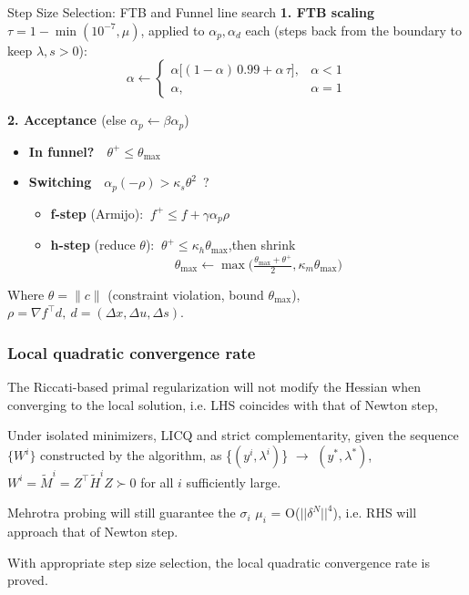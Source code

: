 \documentclass[10pt,aspectratio=1610]{beamer} %
\begin{document}
\begin{frame}{Step Size Selection: FTB and Funnel line search}
\textbf{\textcolor{blue!60!black}{1. FTB scaling}}\quad
$\tau=1-\min(10^{-7},\mu)$, applied to $\alpha_p,\alpha_d$ each (steps back from the boundary to keep $\lambda,s>0$):
\[
\alpha \leftarrow
\begin{cases}
\alpha\big[(1-\alpha)\,0.99+\alpha\,\tau\big], & \alpha<1\\
\alpha, & \alpha=1
\end{cases}
\]
 
\vspace{0.4em}
\textbf{\textcolor{blue!60!black}{2. Acceptance \cite{kiesslingUnifiedFunnelRestoration2025}}}\quad (else $\alpha_p\!\leftarrow\!\beta\alpha_p$)
\begin{itemize}
  \item \textbf{In funnel?}\ \ $\theta^+\le\theta_{\max}$
  \item \textbf{Switching}\ \ $\alpha_p(-\rho)>\kappa_{s}\theta^2$\ ?
  \begin{itemize}
    \item[$\rightarrow$] \textbf{f-step} (Armijo): $\ f^+\le f+\gamma\alpha_p\rho$
    \item[$\rightarrow$] \textbf{h-step} (reduce $\theta$): $\ \theta^+\le \kappa_{h}\theta_{\max}$,\quad then shrink
    \[
      \theta_{\max}\leftarrow\max\big(\tfrac{\theta_{\max}+\theta^+}{2},\kappa_{m}\theta_{\max}\big)
    \]
  \end{itemize}
\end{itemize}
Where $\theta=\|c\|$ (constraint violation, bound $\theta_{\max}$), $\rho=\nabla f^\top d,\ d=(\Delta x,\Delta u,\Delta s)$.

\end{frame}



\begin{frame}
    \frametitle{Local quadratic convergence rate}
    The Riccati-based primal regularization will not modify the Hessian when converging to the local solution, i.e. LHS coincides with that of Newton step,
    \begin{lemma}
    Under isolated minimizers, LICQ and strict complementarity, given the sequence $\{W^i\}$ constructed by the algorithm, as \{$(y^i, \lambda^i)$\} $\rightarrow$ $(y^*, \lambda^*)$,
    $W^i = \tilde{M}^i = Z^\top \tilde{H}^i Z \succ 0$ for all $i$ sufficiently large.
    \end{lemma}
    Mehrotra probing will still guarantee the $\sigma_i$ $\mu_i$ = O($||\delta^N||^4$), i.e. RHS will approach that of Newton step.

    \vspace{0.2cm}

    With appropriate step size selection, the local quadratic convergence rate is proved.
\end{frame}
\end{document}
